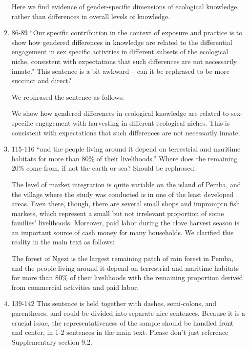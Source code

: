 \documentclass{article}
\newcommand{\rev}[1]{{\color{Red}#1}}
\newcommand{\comment}[1]{{\color{Blue}#1}}
\begin{document}
\begin{enumerate}
    \rev{Here we find evidence of gender-specific dimensions of ecological knowledge, rather than differences in overall levels of knowledge.}

    \item 86-89 “Our specific contribution in the context of exposure and practice is to show how gendered differences in knowledge are related to the differential engagement in sex specific activities in different subsets of the ecological niche, consistent with expectations that such differences are not necessarily innate.” This sentence is a bit awkward – can it be rephrased to be more succinct and direct?
    
    \comment{We rephrased the sentence as follows:}
    
    \rev{We show how gendered differences in ecological knowledge are related to sex-specific engagement with harvesting in different ecological niches. This is consistent with expectations that such differences are not necessarily innate.} 

    \item 115-116 “and the people living around it depend on terrestrial and maritime habitats for more than 80\% of their livelihoods.” Where does the remaining 20\% come from, if not the earth or sea? Should be rephrased.
    
    \comment{The level of market integration is quite variable on the island of Pemba, and the village where the study was conducted is in one of the least developed areas. Even there, though, there are several small shops and impromptu fish markets, which represent a small but not irrelevant proportion of some families' livelihoods. Moreover, paid labor during the clove harvest season is an important source of cash money for many households. We clarified this reality in the main text as follows:}
    
    \rev{The forest of Ngezi is the largest remaining patch of rain forest in Pemba, and the people living around it depend on terrestrial and maritime habitats for more than 80\% of their livelihoods \rev{ with the remaining proportion derived from commercial activities and paid labor}. }

    \item 139-142 This sentence is held together with dashes, semi-colons, and parentheses, and could be divided into separate nice sentences. Because it is a crucial issue, the representativeness of the sample should be handled front and center, in 1-2 sentences in the main text. Please don’t just reference Supplementary section 9.2.
    

\end{enumerate}
\end{document}
